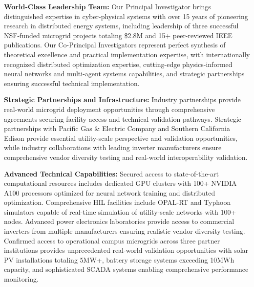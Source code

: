 \documentclass[12pt]{article}
\begin{document}
\textbf{World-Class Leadership Team:} Our Principal Investigator brings distinguished expertise in cyber-physical systems with over 15 years of pioneering research in distributed energy systems, including leadership of three successful NSF-funded microgrid projects totaling \$2.8M and 15+ peer-reviewed IEEE publications. Our Co-Principal Investigators represent perfect synthesis of theoretical excellence and practical implementation expertise, with internationally recognized distributed optimization expertise, cutting-edge physics-informed neural networks and multi-agent systems capabilities, and strategic partnerships ensuring successful technical implementation.

\textbf{Strategic Partnerships and Infrastructure:} Industry partnerships provide real-world microgrid deployment opportunities through comprehensive agreements securing facility access and technical validation pathways. Strategic partnerships with Pacific Gas \& Electric Company and Southern California Edison provide essential utility-scale perspective and validation opportunities, while industry collaborations with leading inverter manufacturers ensure comprehensive vendor diversity testing and real-world interoperability validation.

\textbf{Advanced Technical Capabilities:} Secured access to state-of-the-art computational resources includes dedicated GPU clusters with 100+ NVIDIA A100 processors optimized for neural network training and distributed optimization. Comprehensive HIL facilities include OPAL-RT and Typhoon simulators capable of real-time simulation of utility-scale networks with 100+ nodes. Advanced power electronics laboratories provide access to commercial inverters from multiple manufacturers ensuring realistic vendor diversity testing. Confirmed access to operational campus microgrids across three partner institutions provides unprecedented real-world validation opportunities with solar PV installations totaling 5MW+, battery storage systems exceeding 10MWh capacity, and sophisticated SCADA systems enabling comprehensive performance monitoring.
\end{document}

